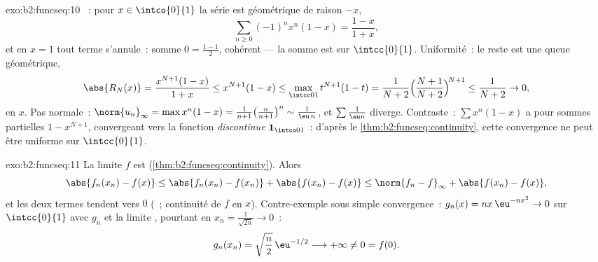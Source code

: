 \begin{solution}{exo:b2:funcseq:10}
~: pour $x \in \intco{0}{1}$ la série est géométrique de
raison $-x$,
\[
\sum_{n\geq0}(-1)^n x^n(1-x) = \frac{1-x}{1+x},
\]
et en $x = 1$ tout terme s'annule~: somme $0 = \frac{1-1}{2}$,
cohérent --- la somme est  sur $\intcc{0}{1}$.
Uniformité~: le reste est une queue géométrique,
\[
\abs{R_N(x)} = \frac{x^{N+1}(1-x)}{1+x} \leq x^{N+1}(1 - x)
\leq \max_{\intcc01} t^{N+1}(1-t)
= \frac{1}{N+2}\Bigl(\frac{N+1}{N+2}\Bigr)^{\!N+1}
\leq \frac{1}{N+2} \to 0 ,
\]
 en $x$. Pas normale~: $\norm{u_n}_\infty =
\max x^n(1-x) = \frac{1}{n+1}\bigl(\frac{n}{n+1}\bigr)^n \sim
\frac{1}{\eu\,n}$, et $\sum \frac1{\eu n}$ diverge. Contraste~:
$\sum x^n(1-x)$ a pour sommes partielles $1 - x^{N+1}$, convergeant
 vers la fonction \emph{discontinue} $\mathbf 1_{\intco01}$~:
d'après le \cref{thm:b2:funcseq:continuity}, cette convergence ne peut
être uniforme sur $\intcc{0}{1}$.
\end{solution}

\begin{solution}{exo:b2:funcseq:11}
La limite $f$ est  (\cref{thm:b2:funcseq:continuity}).
Alors
\[
\abs{f_n(x_n) - f(x)}
\leq \abs{f_n(x_n) - f(x_n)} + \abs{f(x_n) - f(x)}
\leq \norm{f_n - f}_\infty + \abs{f(x_n) - f(x)} ,
\]
et les deux termes tendent vers $0$ (~; continuité
de $f$ en $x$). Contre-exemple sous simple convergence~:
$g_n(x) = nx\,\eu^{-nx^2} \to 0$  sur $\intcc{0}{1}$
avec $g_n$ et la limite , pourtant en $x_n =
\frac{1}{\sqrt{2n}} \to 0$~:
\[
g_n(x_n) = \sqrt{\frac n2}\,\eu^{-1/2} \longrightarrow +\infty
\neq 0 = f(0) .
\]
\end{solution}

